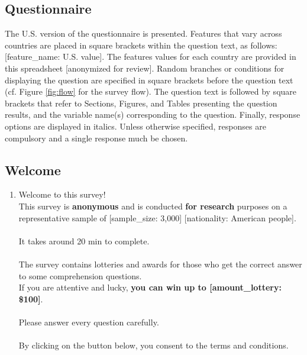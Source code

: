 \documentclass[12pt,english]{article}
\begin{document}
\begin{bibunit}

\renewcommand{\theenumi}{\arabic{enumi}}
\clearpage
\section{Questionnaire}\label{app:questionnaire}
The U.S. version of the questionnaire is presented. Features that vary across countries are placed in square brackets within the question text, as follows: [feature\_name: U.S. value]. The features values for each country are provided in this spreadsheet [anonymized for review]. %
Random branches or conditions for displaying the question are specified in square brackets before the question text (cf. Figure \ref{fig:flow} for the survey flow). The question text is followed by square brackets that refer to Sections, Figures, and Tables presenting the question results, and the variable name(s) corresponding to the question. Finally, response options are displayed in italics. 
Unless otherwise specified, responses are compulsory and a single response much be chosen. %

\subsection*{Welcome} 
 \begin{enumerate} 
\item  \label{q:consent} Welcome to this survey!\\
This survey is \textbf{anonymous }and is conducted \textbf{for research} purposes on a representative sample of [sample\_size: 3,000] [nationality: American people].\\
~\\
It takes around 20 min to complete.\\
~\\
The survey contains lotteries and awards for those who get the correct answer to some comprehension questions.\\
If you are attentive and lucky, \textbf{you can win up to [amount\_lottery: \$100]}.\\
~\\
Please answer every question carefully.\\
~\\
By clicking on the button below, you consent to the terms and conditions.

\end{enumerate} 


\end{bibunit}
\end{document}
